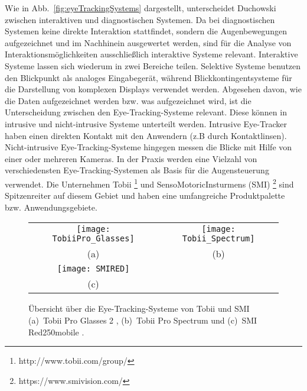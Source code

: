 Wie in Abb.~\ref{fig:eyeTrackingSystems} dargestellt, unterscheidet Duchowski \cite{Duchowski} zwischen interaktiven und diagnostischen Systemen. Da bei diagnostischen Systemen keine direkte Interaktion stattfindet, sondern die Augenbewegungen aufgezeichnet und im Nachhinein ausgewertet werden, sind für die Analyse von Interaktionsmöglichkeiten ausschließlich interaktive Systeme relevant. 
\newline \newline
Interaktive Systeme lassen sich wiederum in zwei Bereiche teilen. Selektive Systeme benutzen den Blickpunkt als analoges Eingabegerät, während Blickkontingentsysteme für die Darstellung von komplexen Displays verwendet werden. 
\newline \newline
Abgesehen davon, wie die Daten aufgezeichnet werden bzw. was aufgezeichnet wird, ist die Unterscheidung zwischen den Eye-Tracking-Systeme relevant. Diese können in intrusive und nicht-intrusive Systeme unterteilt werden. Intrusive Eye-Tracker haben einen direkten Kontakt mit den Anwendern (z.B durch Kontaktlinsen). Nicht-intrusive Eye-Tracking-Systeme hingegen messen die Blicke mit Hilfe von einer oder mehreren Kameras. 
\newline \newline
In der Praxis werden eine Vielzahl von verschiedensten Eye-Tracking-Systemen als Basis für die Augensteuerung verwendet. Die Unternehmen Tobii %
\footnote{http://www.tobii.com/group/}
%
und SensoMotoricInsturmens (SMI) %
\footnote{https://www.smivision.com/}
%
sind Spitzenreiter auf diesem Gebiet und haben eine umfangreiche Produktpalette bzw. Anwendungsgebiete. 
\begin{figure}
\centering\small
\setlength{\tabcolsep}{0mm}	%
\begin{tabular}{c@{\hspace{-15mm}}c} %
  \texttt{[image: TobiiPro\_Glasses]} &
  \texttt{[image: Tobii\_Spectrum]}
\\
  (a) & (b)
\\[4pt]	%
  \texttt{[image: SMIRED]}
\\
  (c)
\end{tabular}
%
\caption{Übersicht über die Eye-Tracking-Systeme von Tobii und SMI \newline
(a)~Tobii Pro Glasses 2 \cite{TobiiGlasses}, (b)~Tobii Pro Spectrum \cite{TobiiSpectrum} und (c)~SMI Red250mobile \cite{SMIRED}.}
\label{fig:Tobii}
\end{figure}
